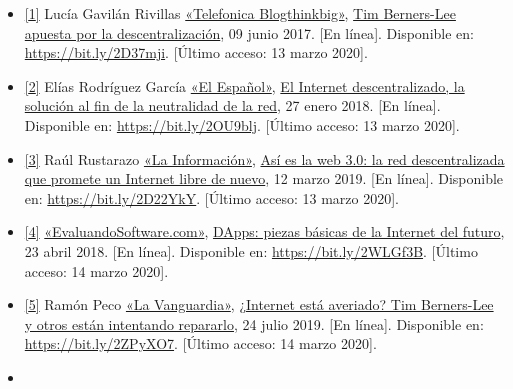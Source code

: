 \documentclass[12pt,spanish,Letterpaper,openany]{book}
\newcommand{\spaceminusmilis}{\vspace{-0.5mm}}
\begin{document}
\begin{itemize}
\item
  \hypertarget{articulo11_ref01}{}

  \protect\hyperlink{articulo11_cross01}{{[}1{]}} Lucía Gavilán Rivillas \href{https://blogthinkbig.com/}{«Telefonica Blogthinkbig»}, \href{https://blogthinkbig.com/descentralizacion-de-la-web}{Tim Berners-Lee apuesta por la descentralización}, 09 junio 2017. {[}En línea{]}. Disponible en: \url{https://bit.ly/2D37mji}. {[}Último acceso: 13 marzo 2020{]}.
\item
  \hypertarget{articulo11_ref02}{}

  \protect\hyperlink{articulo11_cross02}{{[}2{]}} Elías Rodríguez García \href{https://www.elespanol.com/}{«El Español»}, \href{https://www.elespanol.com/omicrono/20180127/internet-descentralizado-solucion-fin-neutralidad-red/280472793_0.html/}{El Internet descentralizado, la solución al fin de la neutralidad de la red}, 27 enero 2018. {[}En línea{]}. Disponible en: \url{https://bit.ly/2OU9blj}. {[}Último acceso: 13 marzo 2020{]}.
\item
  \hypertarget{articulo11_ref03}{}

  \protect\hyperlink{articulo11_cross03}{{[}3{]}} Raúl Rustarazo \href{https://www.lainformacion.com/}{«La Información»}, \href{https://www.lainformacion.com/management/asi-es-la-web-3-0-la-red-descentralizada-que-promete-un-internet-libre-de-nuevo/6494658/}{Así es la web 3.0: la red descentralizada que promete un Internet libre de nuevo}, 12 marzo 2019. {[}En línea{]}. Disponible en: \url{https://bit.ly/2D22YkY}. {[}Último acceso: 13 marzo 2020{]}.
  \spaceminusmilis
\item
  \hypertarget{articulo11_ref04}{}

  \protect\hyperlink{articulo11_cross04}{{[}4{]}} \href{https://www.evaluandosoftware.com/}{«EvaluandoSoftware.com»}, \href{https://www.evaluandosoftware.com/dapps-piezas-basicas-la-internet-del-futuro/}{DApps: piezas básicas de la Internet del futuro}, 23 abril 2018. {[}En línea{]}. Disponible en: \url{https://bit.ly/2WLGf3B}. {[}Último acceso: 14 marzo 2020{]}.
  \spaceminusmilis
\item
  \hypertarget{articulo11_ref05}{}

  \protect\hyperlink{articulo11_cross05}{{[}5{]}} Ramón Peco \href{https://www.lavanguardia.com/}{«La Vanguardia»}, \href{https://www.lavanguardia.com/tecnologia/20190724/463676999523/internet-averiado-tim-berners-lee-reparar-dweb-web-descentralizada-internet-descentralizado-p2p-blockchain.html}{¿Internet está averiado? Tim Berners-Lee y otros están intentando repararlo}, 24 julio 2019. {[}En línea{]}. Disponible en: \url{https://bit.ly/2ZPyXO7}. {[}Último acceso: 14 marzo 2020{]}.
  \spaceminusmilis
\item
  \hypertarget{articulo11_ref06}{}


\end{itemize}
\end{document}

